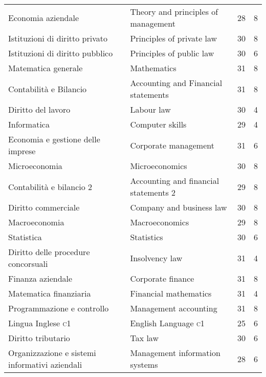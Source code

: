 \documentclass[a4paper,10pt]{article}
\begin{document}
\begin{center}

\tabletail{%
}
\tablelasttail{}	

 \begin{supertabular}{p{4.9cm} p{4.9cm} c c}
Economia aziendale&Theory and principles of management& 28 & 8\\
Istituzioni di diritto privato&Principles of private law&30&8\\
 Istituzioni di diritto pubblico 
&
 Principles of public law 
& 30&
 6 
\\
Matematica generale 
& Mathematics 
&31&8\\
 Contabilit\`a e Bilancio 
& Accounting and Financial statements 
& 31 & 8\\
 Diritto del lavoro 
&
 Labour law 
& 30&
4 
\\
 Informatica & Computer skills &29& 4 
\\
 Economia e gestione delle imprese & Corporate management &31&6 
\\
 Microeconomia & Microeconomics &30&8 
\\
 Contabilit\`a e bilancio 2 & Accounting and financial statements 2 
&29&8 \\
 Diritto commerciale & Company and business law &30&8 
\\
 Macroeconomia & Macroeconomics &29&8 
\\
 Statistica & Statistics &30&6\\
 Diritto delle procedure concorsuali & Insolvency law &31&4 
\\
 Finanza aziendale 
& Corporate finance 
&31 &8 \\
 Matematica finanziaria & Financial mathematics &31&4 
\\
 Programmazione e controllo 
& Management accounting &31&8 
\\
Lingua Inglese \textsc{c1}& English Language \textsc{c1}& 25&6\\ 
Diritto tributario & Tax law &30&6 
\\
Organizzazione e sistemi informativi aziendali &Management information systems &28&6 
\\

\end{supertabular}
\end{center}
\end{document}
